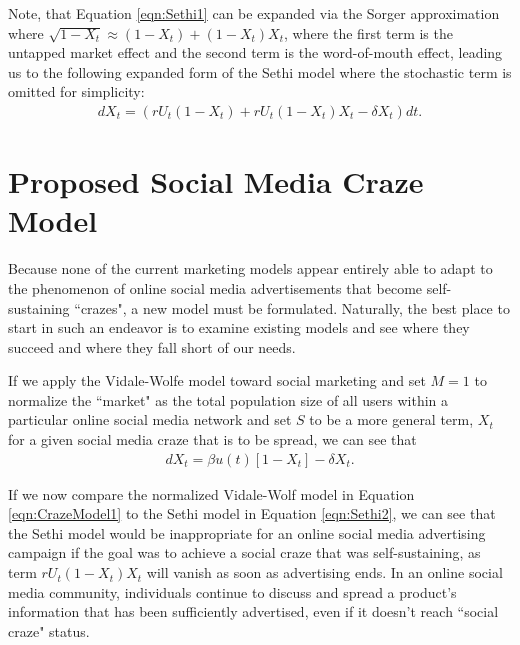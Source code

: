 Note, that Equation \ref{eqn:Sethi1} can be expanded via the Sorger \cite{sorger1989competitive} approximation where $\sqrt{1-X_t}\approx (1-X_t)+(1-X_t)X_t$, where the first term is the untapped market effect and the second term is the word-of-mouth effect, leading us to the following expanded form of the Sethi model where the stochastic term is omitted for simplicity:
\begin{equation} \label{eqn:Sethi2}
\left.\begin{aligned}
dX_t=(rU_t (1-X_t)+rU_t(1-X_t)X_t-\delta X_t)dt.
\end{aligned}\right.
\end{equation}

\section{Proposed Social Media Craze Model}
Because none of the current marketing models appear entirely able to adapt to the phenomenon of online social media advertisements that become self-sustaining ``crazes", a new model must be formulated. Naturally, the best place to start in such an endeavor is to examine existing models and see where they succeed and where they fall short of our needs. 

If we apply the Vidale-Wolfe model toward social marketing and set $M=1$ to normalize the ``market" as the total population size of all users within a particular online social media network and set $S$ to be a more general term, $X_t$ for a given social media craze that is to be spread, we can see that
\begin{equation} \label{eqn:CrazeModel1}
\left.\begin{aligned}
dX_t=\beta u(t)[1-X_t]-\delta X_t.
\end{aligned}\right.
\end{equation}

If we now compare the normalized Vidale-Wolf model in Equation \ref{eqn:CrazeModel1} to the Sethi model in Equation \ref{eqn:Sethi2}, we can see that the Sethi model would be inappropriate for an online social media advertising campaign if the goal was to achieve a social craze that was self-sustaining, as term $rU_t(1-X_t)X_t$ will vanish as soon as advertising ends. In an online social media community, individuals continue to discuss and spread a product's information that has been sufficiently advertised, even if it doesn't reach ``social craze" status. 

